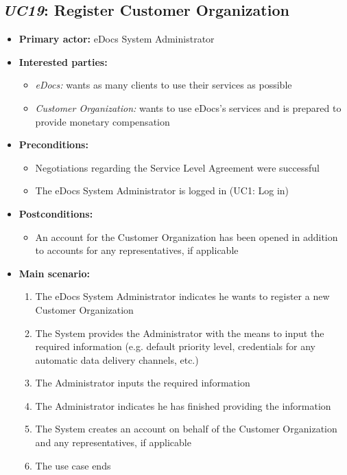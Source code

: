 \documentclass[a4paper,10pt]{article}
\begin{document}
\subsection{\emph{UC19}: Register Customer Organization}
\begin{itemize}
	\item \textbf{Primary actor:} eDocs System Administrator
	\item \textbf{Interested parties:} 
	\begin{itemize}
		\item \textit{eDocs:} wants as many clients to use their services as possible
		\item \textit{Customer Organization:} wants to use eDocs's services and is prepared to provide monetary compensation
	\end{itemize}
	
	\item \textbf{Preconditions:}
	\begin{itemize}
		\item Negotiations regarding the Service Level Agreement were successful
		\item The eDocs System Administrator is logged in (UC1: Log in)
	\end{itemize}
	
	\item \textbf{Postconditions:}
	\begin{itemize}
		\item An account for the Customer Organization has been opened in addition to accounts for any representatives, if applicable
	\end{itemize}
	
	\item \textbf{Main scenario:} 
	\begin{enumerate}
		\item The eDocs System Administrator indicates he wants to register a new Customer Organization
		\item The System provides the Administrator with the means to input the required information (e.g. default priority level, credentials for any automatic data delivery channels, etc.)
		\item The Administrator inputs the required information
		\item The Administrator indicates he has finished providing the information
		\item The System creates an account on behalf of the Customer Organization and any representatives, if applicable
		\item The use case ends
	\end{enumerate}
	

\end{itemize}
\end{document}
